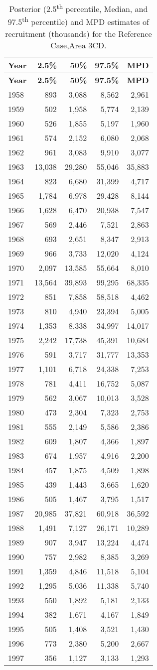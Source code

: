 \documentclass[11pt]{book}
\begin{document}
\begin{longtable}[]{@{}lrrrr@{}}
\caption{\label{tab:tab-post-recr-3cd}Posterior (2.5\textsuperscript{th} percentile, Median, and 97.5\textsuperscript{th} percentile) and MPD estimates of recruitment (thousands) for the Reference Case,Area 3CD.}\tabularnewline
\toprule
\textbf{Year} & \textbf{2.5\%} & \textbf{50\%} & \textbf{97.5\%} & \textbf{MPD}\tabularnewline
\midrule
\endfirsthead
\toprule
\textbf{Year} & \textbf{2.5\%} & \textbf{50\%} & \textbf{97.5\%} & \textbf{MPD}\tabularnewline
\midrule
\endhead
1958 & 893 & 3,088 & 8,562 & 2,961\tabularnewline
1959 & 502 & 1,958 & 5,774 & 2,139\tabularnewline
1960 & 526 & 1,855 & 5,197 & 1,960\tabularnewline
1961 & 574 & 2,152 & 6,080 & 2,068\tabularnewline
1962 & 961 & 3,083 & 9,910 & 3,077\tabularnewline
1963 & 13,038 & 29,280 & 55,046 & 35,883\tabularnewline
1964 & 823 & 6,680 & 31,399 & 4,717\tabularnewline
1965 & 1,784 & 6,978 & 29,428 & 8,144\tabularnewline
1966 & 1,628 & 6,470 & 20,938 & 7,547\tabularnewline
1967 & 569 & 2,446 & 7,521 & 2,863\tabularnewline
1968 & 693 & 2,651 & 8,347 & 2,913\tabularnewline
1969 & 966 & 3,733 & 12,020 & 4,124\tabularnewline
1970 & 2,097 & 13,585 & 55,664 & 8,010\tabularnewline
1971 & 13,564 & 39,893 & 99,295 & 68,335\tabularnewline
1972 & 851 & 7,858 & 58,518 & 4,462\tabularnewline
1973 & 810 & 4,940 & 23,394 & 5,005\tabularnewline
1974 & 1,353 & 8,338 & 34,997 & 14,017\tabularnewline
1975 & 2,242 & 17,738 & 45,391 & 10,684\tabularnewline
1976 & 591 & 3,717 & 31,777 & 13,353\tabularnewline
1977 & 1,101 & 6,718 & 24,338 & 7,253\tabularnewline
1978 & 781 & 4,411 & 16,752 & 5,087\tabularnewline
1979 & 562 & 3,067 & 10,013 & 3,528\tabularnewline
1980 & 473 & 2,304 & 7,323 & 2,753\tabularnewline
1981 & 555 & 2,149 & 5,586 & 2,386\tabularnewline
1982 & 609 & 1,807 & 4,366 & 1,897\tabularnewline
1983 & 674 & 1,957 & 4,916 & 2,200\tabularnewline
1984 & 457 & 1,875 & 4,509 & 1,898\tabularnewline
1985 & 439 & 1,443 & 3,665 & 1,620\tabularnewline
1986 & 505 & 1,467 & 3,795 & 1,517\tabularnewline
1987 & 20,985 & 37,821 & 60,918 & 36,592\tabularnewline
1988 & 1,491 & 7,127 & 26,171 & 10,289\tabularnewline
1989 & 907 & 3,947 & 13,224 & 4,474\tabularnewline
1990 & 757 & 2,982 & 8,385 & 3,269\tabularnewline
1991 & 1,359 & 4,846 & 11,518 & 5,104\tabularnewline
1992 & 1,295 & 5,036 & 11,338 & 5,740\tabularnewline
1993 & 550 & 1,892 & 5,181 & 2,133\tabularnewline
1994 & 382 & 1,671 & 4,167 & 1,849\tabularnewline
1995 & 505 & 1,408 & 3,521 & 1,430\tabularnewline
1996 & 773 & 2,380 & 5,200 & 2,667\tabularnewline
1997 & 356 & 1,127 & 3,133 & 1,293\tabularnewline

\end{longtable}
\end{document}
